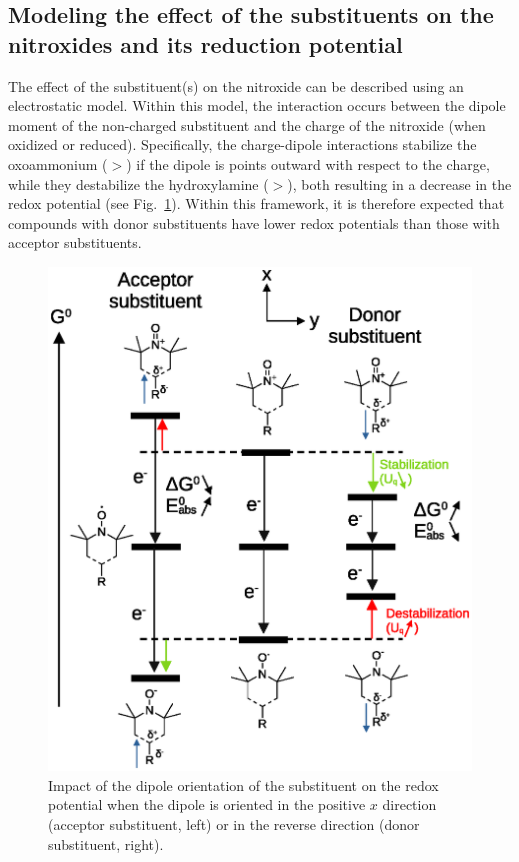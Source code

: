 \documentclass[review,preprint]{elsarticle}
\begin{document}
\subsection{Modeling the effect of the substituents on the nitroxides and its reduction potential}\label{sec:eleczhang}

The effect of the substituent(s) on the nitroxide can be described using an electrostatic model. Within this model, the interaction occurs between the dipole moment of the non-charged substituent and the charge of the nitroxide (when oxidized or reduced).  Specifically, the charge-dipole interactions stabilize the oxoammonium ($>$) if the dipole is points outward with respect to the charge, while they destabilize the hydroxylamine ($>$), both resulting in a decrease in the redox potential (see Fig.~\ref{fig:dipole}). Within this framework, it is therefore expected that compounds with donor substituents have lower redox potentials than those with acceptor substituents.


\begin{figure}[!h]
	\centering
	\includegraphics[width=\linewidth]{Figure4}
	\caption{Impact of the dipole orientation of the  substituent on the redox potential when the dipole is oriented in  the positive $x$ direction (acceptor substituent, left) or in the reverse direction (donor substituent, right).}
	\label{fig:dipole}
\end{figure}
\end{document}
